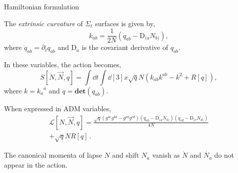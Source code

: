 \documentclass{beamer}
\newcommand\italictext[1]{\textcolor{italics}{\textit{#1}}}
\begin{document}
\begin{frame}{Hamiltonian formulation}
    \begin{list}{\maltese}{\leftmargin=1em \itemindent=0em}
        \item<1-> The \italictext{extrinsic curvature} of $\Sigma_t$ surfaces is given by,
        \begin{equation}
            k_{ab}=\frac{1}{2N}\left(\dot{q}_{ab}-\text{D}_{(a}N_{b)}\right),
        \end{equation}
        where $\dot{q}_{ab}=\partial_t q_{ab}$ and $\text{D}_{a}$ is the covariant derivative of $q_{ab}$.
        \item<2-> In these variables, the action becomes,
        \begin{equation}
            S[N,\vec{N},q]=\int\dd{t}\int\dd[3]{x}\sqrt{q}N\left(k_{ab}k^{ab}-k^2+R[q]\right),
        \end{equation}
        where $k={k_a}^a$ and $q=\mathbf{det}(q_{ab})$.
        \item<3-> When expressed in ADM variables,
        \begin{multline}
            \mathcal{L}[N,\vec{N},q]=\frac{\sqrt{q}\left({g}^{ac}{g}^{bd}-{g}^{ab}{g}^{cd}\right)\left(\dot{q}_{ab}-\text{D}_{(a}N_{b)}\right)\left(\dot{q}_{cd}-\text{D}_{(c}N_{d)}\right)}{4N}\\+\sqrt{q}NR[q]\,.
        \end{multline}
        \item<4-> The canonical momenta of lapse $N$ and shift $N_a$ vanish as $\dot{N}$ and $\dot{N_a}$ do not appear in the action.
    \end{list}
\end{frame}
\end{document}
